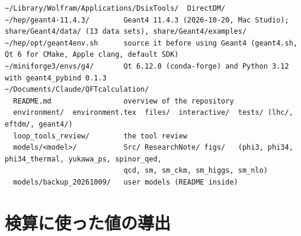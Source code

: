 \documentclass[a4paper,10pt]{ltjsarticle}
\begin{document}
\begin{Verbatim}
~/Library/Wolfram/Applications/DsixTools/  DirectDM/
~/hep/geant4-11.4.3/        Geant4 11.4.3 (2026-10-20, Mac Studio); share/Geant4/data/ (13 data sets), share/Geant4/examples/
~/hep/opt/geant4env.sh      source it before using Geant4 (geant4.sh, Qt 6 for CMake, Apple clang, default SDK)
~/miniforge3/envs/g4/       Qt 6.12.0 (conda-forge) and Python 3.12 with geant4_pybind 0.1.3
~/Documents/Claude/QFTcalculation/
  README.md                 overview of the repository
  environment/  environment.tex  files/  interactive/  tests/ (lhc/, eftdm/, geant4/)
  loop_tools_review/        the tool review
  models/<model>/           Src/ ResearchNote/ figs/   (phi3, phi34, phi34_thermal, yukawa_ps, spinor_qed,
                            qcd, sm, sm_ckm, sm_higgs, sm_nlo)
  models/backup_20261009/   user models (README inside)
\end{Verbatim}

\section{検算に使った値の導出}\label{app:derivations}
\end{document}
